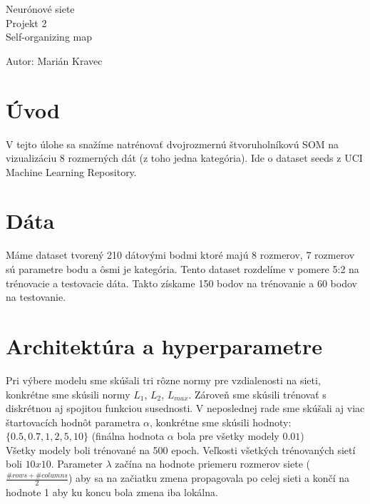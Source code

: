 \documentclass[a4paper]{article}
\begin{document}
 
	
	\pagestyle{plain}
	
	\begin{center}
		\sc\large
		Neurónové siete\\
		Projekt 2\\
		Self-organizing map
	\end{center}
	
	Autor: Marián Kravec
	\\
	
	\section{Úvod}
	
	V tejto úlohe sa snažíme natrénovať dvojrozmernú štvoruholníkovú SOM na vizualizáciu 8 rozmerných dát (z toho jedna kategória). Ide o dataset seeds z UCI Machine Learning Repository.
	
	\section{Dáta}
	
	Máme dataset tvorený 210 dátovými bodmi ktoré majú 8 rozmerov, 7 rozmerov sú parametre bodu a ôsmi je kategória. Tento dataset rozdelíme v pomere 5:2 na trénovacie a testovacie dáta. Takto získame 150 bodov na trénovanie a 60 bodov na testovanie.
	
	\section{Architektúra a hyperparametre}
	
	Pri výbere modelu sme skúšali tri rôzne normy pre vzdialenosti na sieti, konkrétne sme skúsili normy $L_1$, $L_2$, $L_{max}$. Zároveň sme skúsili trénovať s diskrétnou aj spojitou funkciou susednosti. V neposlednej rade sme skúšali aj viac štartovacích hodnôt parametra $\alpha$, konkrétne sme skúsili hodnoty: $\{0.5, 0.7, 1, 2, 5, 10\}$ (finálna hodnota $\alpha$ bola pre všetky modely $0.01$)
	\\
	
	Všetky modely boli trénované na 500 epoch. Veľkosti všetkých trénovaných sietí boli $10x10$. Parameter $\lambda$ začína na hodnote priemeru rozmerov siete ($\frac{\#rows + \#columns}{2}$) aby sa na začiatku zmena propagovala po celej sieti a končí na hodnote 1 aby ku koncu bola zmena iba lokálna. 
	\\
	
\end{document}
